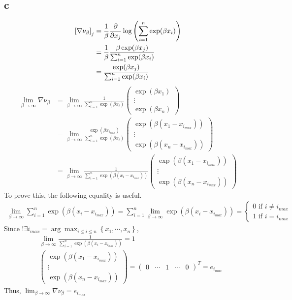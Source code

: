 \documentclass[10pt]{article}
\begin{document}
\subsection*{c}
\begin{align*}
    \left[\nabla \nu_\beta\right]_j &= \frac{1}{\beta}{\partial \over \partial x_j} \log\left(\sum_{i=1}^n \exp(\beta x_i)\right) \\
    &= \frac{1}{\beta}\frac{\beta \exp(\beta x_j)}{\sum_{i=1}^n \exp(\beta x_i)} \\ &= \frac{\exp(\beta x_j)}{\sum_{i=1}^n \exp(\beta x_i)}
\end{align*}
\begin{align*}
    \lim_{\beta \rightarrow \infty} \nabla \nu_\beta  &= \lim_{\beta \rightarrow \infty} \frac{1}{\sum_{i=1}^n \exp(\beta x_i)}\begin{pmatrix}
        \exp(\beta x_1) \\ \vdots \\ \exp(\beta x_n) 
    \end{pmatrix}
    \\ &= \lim_{\beta \rightarrow \infty} \frac{\exp(\beta x_{i_{max}})}{\sum_{i=1}^n \exp(\beta x_i)} \begin{pmatrix}
        \exp(\beta(x_1 - x_{i_{max}})) \\ \vdots \\ \exp(\beta(x_n - x_{i_{max}})) 
    \end{pmatrix} \\
    &= \lim_{\beta \rightarrow \infty} \frac{1}{\sum_{i=1}^n \exp(\beta (x_i - x_{i_{max}}))} \begin{pmatrix}
        \exp(\beta(x_1 - x_{i_{max}})) \\ \vdots \\ \exp(\beta(x_n - x_{i_{max}})) 
    \end{pmatrix}
\end{align*}
To prove this, the following equality is useful. 
\begin{align*}
    \lim_{\beta \rightarrow \infty} \sum_{i=1}^n \exp\left(\beta(x_i - x_{i_{max}})\right) = \sum_{i=1}^n \lim_{\beta \rightarrow \infty } \exp\left(\beta(x_i - x_{i_{max}})\right) = \begin{cases}
        0 \text{ if } i \neq i_{max} \\ 1 \text{ if } i = i_{max}
    \end{cases}
\end{align*}
Since $!\exists i_{max} = \arg\max_{i\le i\le n} \left\{x_1, \cdots, x_n\right\}$, 
\begin{align*}
    &\lim_{\beta \rightarrow \infty} \frac{1}{\sum_{i=1}^n \exp(\beta (x_i - x_{i_{max}}))} = 1 \\
    &\begin{pmatrix}
        \exp(\beta(x_1 - x_{i_{max}})) \\ \vdots \\ \exp(\beta(x_n - x_{i_{max}})) 
    \end{pmatrix} = \begin{pmatrix}
        0 & \cdots & 1 & \cdots & 0 
    \end{pmatrix}^T = e_{i_{max}}
\end{align*}
Thus, $\lim_{\beta \rightarrow \infty} \nabla \nu_\beta = e_{i_{max}}$
\end{document}
